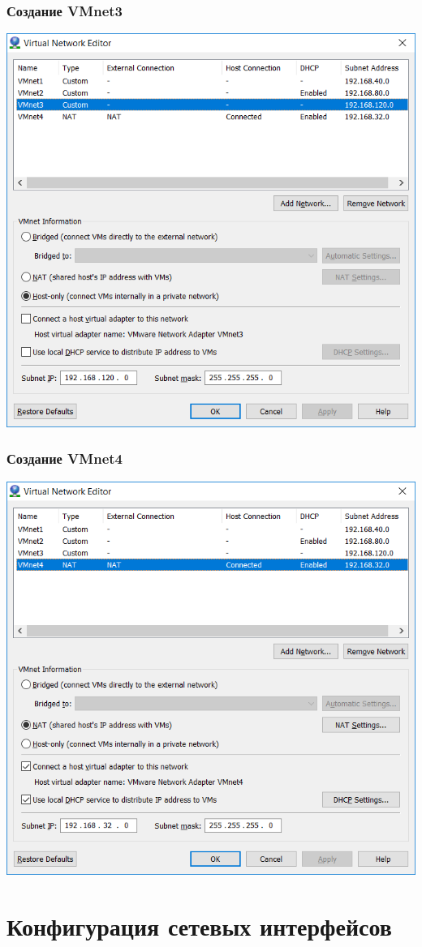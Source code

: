 \documentclass[9pt, compress]{beamer}
\begin{document}
\begin{frame}
\frametitle{Создание VMnet3}
\begin{center}  
	\includegraphics[width=.72\textwidth]{img/vmnet_3}
\end{center}
\end{frame}

\begin{frame}
\frametitle{Создание VMnet4}
\begin{center}  
	\includegraphics[width=.72\textwidth]{img/vmnet_4}
\end{center}
\end{frame}
		
\section{Конфигурация сетевых интерфейсов}
\end{document}
